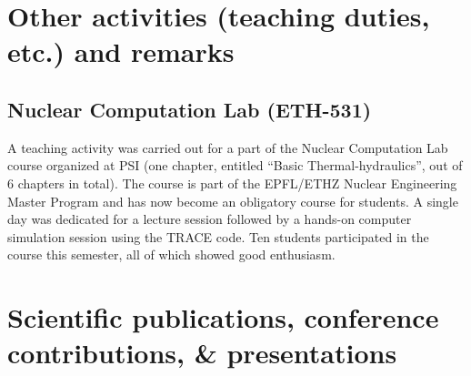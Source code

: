 \documentclass[11pt,titlepage]{article}
\begin{document}
\section{Other activities (teaching duties, etc.) and remarks}

\subsection{Nuclear Computation Lab (ETH-531)}

A teaching activity was carried out for a part of the Nuclear Computation Lab 
course organized at PSI (one chapter, entitled ``Basic Thermal-hydraulics'', out of 
6 chapters in total). 
The course is part of the EPFL/ETHZ Nuclear Engineering Master Program and has 
now become an obligatory course for students.
A single day was dedicated for a lecture session followed by a hands-on computer
simulation session using the TRACE code.
Ten students participated in the course this semester, all of which showed good 
enthusiasm.

\section{Scientific publications, conference contributions, \& presentations}

\nocite{Wicaksono2016}
\nocite{Wicaksono2016a}
\nocite{Wicaksono2016b}
\nocite{Wicaksono2016c}
\nocite{WicaksonoPPTa}
\nocite{WicaksonoPPTb}

\printbibliography[heading=none]
\clearpage
\end{document}
